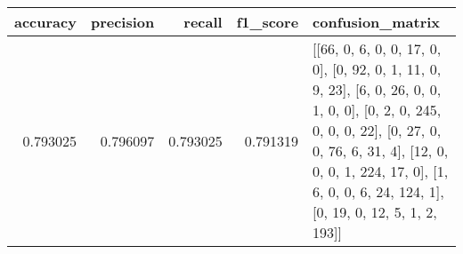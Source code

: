 \begin{tabular}{rrrrl}
\toprule
accuracy & precision & recall & f1_score & confusion_matrix \\
\midrule
0.793025 & 0.796097 & 0.793025 & 0.791319 & [[66, 0, 6, 0, 0, 17, 0, 0], [0, 92, 0, 1, 11, 0, 9, 23], [6, 0, 26, 0, 0, 1, 0, 0], [0, 2, 0, 245, 0, 0, 0, 22], [0, 27, 0, 0, 76, 6, 31, 4], [12, 0, 0, 0, 1, 224, 17, 0], [1, 6, 0, 0, 6, 24, 124, 1], [0, 19, 0, 12, 5, 1, 2, 193]] \\
\bottomrule
\end{tabular}
